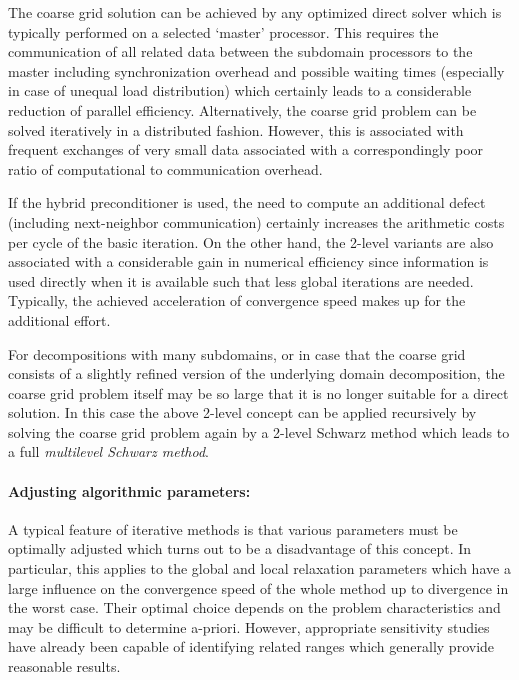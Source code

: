The coarse grid solution can be achieved by any optimized direct solver which is typically performed on a selected `master' processor. This requires the communication of all related data between the subdomain processors to the master including synchronization overhead and possible waiting times (especially in case of unequal load distribution) which certainly leads to a considerable reduction of parallel efficiency.  
Alternatively, the coarse grid problem can be solved iteratively in a distributed fashion. However, this is associated with frequent exchanges of very small data associated with a correspondingly poor ratio of computational to communication overhead.

If the hybrid \tls{} preconditioner is used, the need to compute an additional defect (including next-neighbor communication) certainly increases the arithmetic costs per cycle of the \scarc{} basic iteration.
On the other hand, the 2-level variants are also associated with a considerable gain in numerical efficiency since information is used directly when it is available such that less global iterations are needed. Typically, the achieved acceleration of convergence speed makes up for the additional effort.

For decompositions with many subdomains, or in case that the coarse grid consists of a slightly refined version of the underlying domain decomposition, the coarse grid problem itself may be so large that it is no longer suitable for a direct solution. In this case the above 2-level concept can be applied recursively by solving the coarse grid problem again by a 2-level Schwarz method which leads to a full {\it multilevel Schwarz method}.


\paragraph{Adjusting algorithmic parameters:} 
A typical feature of iterative methods is that various parameters must be optimally adjusted which turns out to be a disadvantage of this concept. In particular, this applies to the global and local relaxation parameters which have a large influence on the convergence speed of the whole method up to divergence in the worst case. Their optimal choice depends on the problem characteristics and may be difficult to determine a-priori. However, appropriate sensitivity studies have already been capable of identifying related ranges which generally provide reasonable results.

